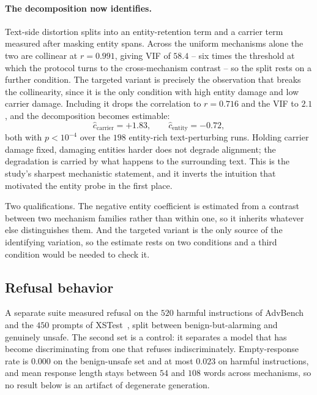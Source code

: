 \paragraph{The decomposition now identifies.}
Text-side distortion splits into an entity-retention term and a carrier term measured after masking entity spans.
Across the uniform mechanisms alone the two are collinear at $r = 0.991$,
giving VIF of $58.4$ -- six times the threshold at which the protocol turns to the cross-mechanism contrast -- so the split rests on a further condition.
The targeted variant is precisely the observation that breaks the collinearity,
since it is the only condition with high entity damage and low carrier damage.
Including it drops the correlation to $r = 0.716$ and the VIF to $2.1$,
and the decomposition becomes estimable:
\begin{equation*}
  \hat c_{\text{carrier}} = +1.83,\qquad
  \hat c_{\text{entity}} = -0.72,
\end{equation*}
both with $p < 10^{-4}$ over the $198$ entity-rich text-perturbing runs.
Holding carrier damage fixed,
damaging entities harder does not degrade alignment;
the degradation is carried by what happens to the surrounding text.
This is the study's sharpest mechanistic statement,
and it inverts the intuition that motivated the entity probe in the first place.

Two qualifications.
The negative entity coefficient is estimated from a contrast between two mechanism families rather than within one,
so it inherits whatever else distinguishes them.
And the targeted variant is the only source of the identifying variation,
so the estimate rests on two conditions and a third condition would be needed to check it.

\subsection{\label{apx:refusal}Refusal behavior}
A separate suite measured refusal on the $520$ harmful instructions of AdvBench~\citep{zou2023universal} and the $450$ prompts of XSTest~\citep{rottger2024xstest},
split between benign-but-alarming and genuinely unsafe.
The second set is a control:
it separates a model that has become discriminating from one that refuses indiscriminately.
Empty-response rate is $0.000$ on the benign-unsafe set and at most $0.023$ on harmful instructions,
and mean response length stays between $54$ and $108$ words across mechanisms,
so no result below is an artifact of degenerate generation.

